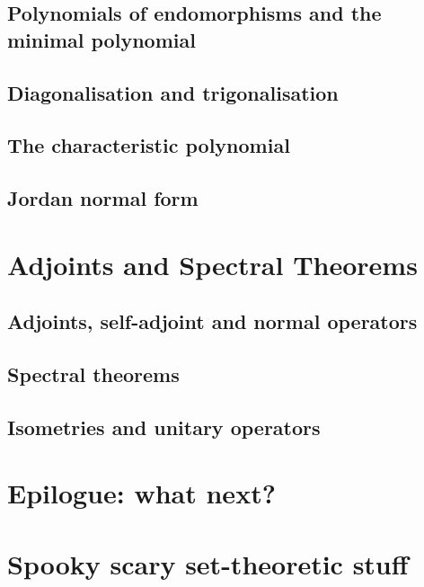 \documentclass{book}
\theoremstyle{plain}
\theoremstyle{definition}
\theoremstyle{remark}
\begin{document}
\section{Polynomials of endomorphisms and the minimal polynomial}

\section{Diagonalisation and trigonalisation}

\section{The characteristic polynomial}

\section{Jordan normal form}

\chapter{Adjoints and Spectral Theorems}

\section{Adjoints, self-adjoint and normal operators}

\section{Spectral theorems}

\section{Isometries and unitary operators}

\chapter*{Epilogue: what next?}

\appendix

\chapter{Spooky scary set-theoretic stuff}
\end{document}
